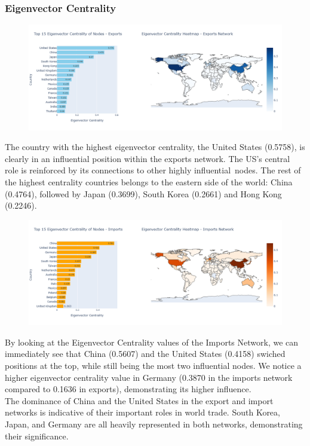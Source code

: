 \documentclass[12pt, a4paper]{article}
\begin{document}
\subsubsection{Eigenvector Centrality}
\begin{figure}[ht]
\centering
\includegraphics[width=\textwidth]{img/exporteigen.png}
\label{fig:exporteigen}
\end{figure}
The country with the highest eigenvector centrality, the United States (0.5758), is clearly in an influential position within the exports network. The US's central role is reinforced by its connections to other highly influential nodes. The rest of the highest centrality countries belongs to the eastern side of the world: China (0.4764), followed by Japan (0.3699), South Korea (0.2661) and Hong Kong (0.2246).
\begin{figure}[ht]
\centering
\includegraphics[width=\textwidth]{img/importeigen.png}
\label{fig:importeigen}
\end{figure}
By looking at the Eigenvector Centrality values of the Imports Network, we can immediately see that China (0.5607) and the United States (0.4158) swiched positions at the top, while still being the most two influential nodes. We notice a higher eigenvector centrality value in Germany (0.3870 in the imports network compared to 0.1636 in exports), demonstrating its higher influence.\\
The dominance of China and the United States in the export and import networks is indicative of their important roles in world trade. South Korea, Japan, and Germany are all heavily represented in both networks, demonstrating their significance.
\end{document}
